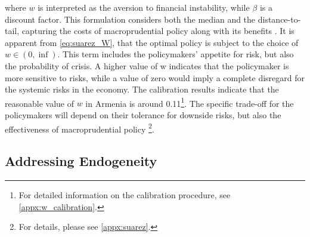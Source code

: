\documentclass[12pt,a4paper]{article}
\begin{document}
where $w$ is interpreted as the aversion to financial instability, while $\beta$ is a discount factor. This formulation considers both the median and the distance-to-tail, capturing the costs of macroprudential policy along with its benefits \citep{cecchetti_2021}. It is apparent from \autoref{eq:suarez_W}, that the optimal policy is subject to the choice of $w\in(0,\inf)$. This term includes the policymakers' appetite for risk, but also the probability of crisis. A higher value of w indicates that the policymaker is more sensitive to risks, while a value of zero would imply a complete disregard for the systemic risks in the economy. The calibration results indicate that the reasonable value of $w$ in Armenia is around 0.11\footnote{For detailed information on the calibration procedure, see \ref{appx:w_calibration}.}. The specific trade-off for the policymakers will depend on their tolerance for downside risks, but also the effectiveness of macroprudential policy \citep{esrb2021, suarez2022} \footnote{For details, please see \ref{appx:suarez}.}.

\subsection{Addressing Endogeneity}
\end{document}
